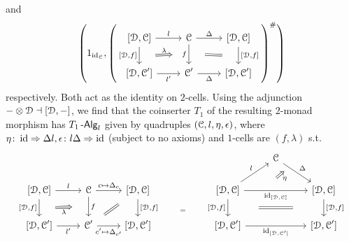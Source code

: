 \documentclass[a4paper,11pt,oneside,openany]{scrbook}
\begin{document}
and
\[\left( 1_{\id_{\C}}, \left(\begin{tikzcd}
	{[\D,\C]} & \C & {[\D,\C]} \\
	{[\D,\C']} & {\C'} & {[\D,\C']}
	\arrow["{l'}"', from=2-1, to=2-2]
	\arrow["l", from=1-1, to=1-2]
	\arrow["\Delta", from=1-2, to=1-3]
	\arrow["\Delta"', from=2-2, to=2-3]
	\arrow[""{name=0, anchor=center, inner sep=0}, "{[\D,f]}", from=1-3, to=2-3]
	\arrow[""{name=1, anchor=center, inner sep=0}, "f"', from=1-2, to=2-2]
	\arrow[""{name=2, anchor=center, inner sep=0}, "{[\D,f]}"', from=1-1, to=2-1]
	\arrow[shorten <=16pt, shorten >=16pt, Rightarrow, no head, from=1, to=0]
	\arrow["\lambda", shorten <=16pt, shorten >=16pt, Rightarrow, from=2, to=1]
\end{tikzcd}\right)^\#\right)\]
respectively. Both act as the identity on $2$-cells. Using the adjunction $-\otimes\operatorname{\mathcal{D}}\dashv[\operatorname{\mathcal{D}},-]$, we find that the coinserter $T_1$ of the resulting $2$-monad morphism has $T_1\operatorname{-\mathsf{Alg}}_l$ given by quadruples $(\operatorname{\mathcal{C}},l,\eta,\epsilon)$, where $\eta\colon\operatorname{id}\Rightarrow\Delta l, \epsilon\colon l\Delta\Rightarrow\operatorname{id}$ (subject to no axioms) and $1$-cells are $(f,\lambda)$ s.t.\ 
\[\begin{tikzcd}
	&&&&& \C \\
	{[\D,\C]} & \C & {[\D,\C]} & {} & {[\D,\C]} && {[\D,\C]} \\
	{[\D,\C']} & {\C'} & {[\D,\C']} & {} & {[\D,\C']} && {[\D,\C']} \\
	&&& {}
	\arrow["l", from=2-1, to=2-2]
	\arrow["{c\mapsto\Delta_c}", from=2-2, to=2-3]
	\arrow[""{name=0, anchor=center, inner sep=0}, "{[\D,f]}"', from=2-1, to=3-1]
	\arrow["{l'}"', from=3-1, to=3-2]
	\arrow["{c'\mapsto\Delta_{c'}}"', from=3-2, to=3-3]
	\arrow["{[\D,f]}", from=2-3, to=3-3]
	\arrow[""{name=1, anchor=center, inner sep=0}, "f", from=2-2, to=3-2]
	\arrow["{=}"{description}, draw=none, from=2-4, to=3-4]
	\arrow[""{name=2, anchor=center, inner sep=0}, "{[\D,f]}"', from=2-5, to=3-5]
	\arrow["l", from=2-5, to=1-6]
	\arrow[""{name=3, anchor=center, inner sep=0}, "\Delta", from=1-6, to=2-7]
	\arrow[""{name=4, anchor=center, inner sep=0}, "{\id_{[\D,\C]}}"', from=2-5, to=2-7]
	\arrow["{\id_{[\D,\C']}}"', from=3-5, to=3-7]
	\arrow[""{name=5, anchor=center, inner sep=0}, "{[\D,f]}", from=2-7, to=3-7]
	\arrow[shorten <=9pt, shorten >=9pt, Rightarrow, no head, from=3-2, to=2-3]
	\arrow[shorten <=31pt, shorten >=31pt, Rightarrow, no head, from=2, to=5]
	\arrow["\eta"', shift left=4, shorten <=8pt, shorten >=8pt, Rightarrow, from=4, to=3]
	\arrow["\lambda"', shorten <=16pt, shorten >=16pt, Rightarrow, from=0, to=1]
\end{tikzcd}\]
\end{document}
